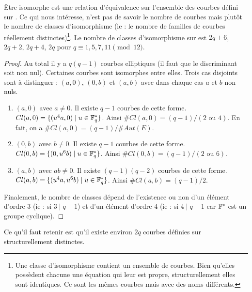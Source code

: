 \begin{theoreme}
\^Etre isomorphe est une relation d'équivalence sur l'ensemble des courbes défini sur . Ce qui nous intéresse, n'est pas de savoir le nombre de courbes mais plutôt le nombre de classes d'isomorphisme (ie : le nombre de familles de courbes réellement distinctes)\footnote{Une classe d'isomorphisme contient un ensemble de courbes. Bien qu'elles possèdent chacune une équation qui leur est propre, structurellement elles sont identiques. Ce sont les mêmes courbes mais avec des noms différents.}. Le nombre de classes d'isomorphisme sur  est $2q + 6$, $2q + 2$, $2q + 4$, $2q$ pour $ q \equiv 1, 5, 7, 11 \pmod{12}$.\begin{proof}
Au total il y a $q(q-1)$ courbes elliptiques (il faut que le discriminant soit non nul). Certaines courbes sont isomorphes entre elles. Trois cas disjoints sont à distinguer : $(a, 0)$, $(0, b)$ et $(a, b)$ avec dans chaque cas $a$ et $b$ non nuls. 
\begin{enumerate}
    \item $(a, 0)$ avec $a \neq 0$. Il existe $q-1$ courbes de cette forme. $Cl(a, 0) = \{ (u^4a, 0) \mid u \in \mathbb{F}_{q}^* \}$. Ainsi $\# Cl(a, 0) = (q-1)/(2 \text{ ou } 4)$. En fait, on a $\# Cl(a, 0) = (q-1)/ \# Aut(E)$.
    \item $(0, b)$ avec $b \neq 0$. Il existe $q-1$ courbes de cette forme. $Cl(0, b) = \{ (0, u^6 b) \mid u \in \mathbb{F}_{q}^* \}$. Ainsi $\# Cl(0, b) = (q-1)/(2 \text{ ou } 6)$.
    \item $(a, b)$ avec $ab \neq 0$. Il existe $(q-1)(q-2)$ courbes de cette forme. $Cl(a, b) = \{ (u^4a, u^6b) \mid u \in \mathbb{F}_{q}^* \}$. Ainsi $\# Cl(a, b) = (q-1)/2$.
\end{enumerate}
Finalement, le nombre de classes dépend de l'existence ou non d'un élément d'ordre $3$ (ie : si $3 \mid q-1$) et d'un élément d'ordre $4$ (ie : si $4 \mid q-1$ car $\mathbb{F}_{}^*$ est un groupe cyclique).
\end{proof}
Ce qu'il faut retenir est qu'il existe environ $2q$ courbes définies sur  structurellement distinctes.
\end{theoreme}

